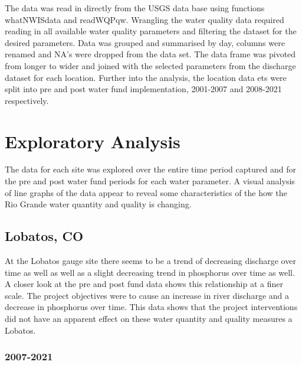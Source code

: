 \documentclass[
  12pt,
]{article}
\begin{document}
The data was read in directly from the USGS data base using functions
whatNWISdata and readWQPqw. Wrangling the water quality data required
reading in all available water quality parameters and filtering the
dataset for the desired parameters. Data was grouped and summarised by
day, columns were renamed and NA's were dropped from the data set. The
data frame was pivoted from longer to wider and joined with the selected
parameters from the discharge dataset for each location. Further into
the analysis, the location data ets were split into pre and post water
fund implementation, 2001-2007 and 2008-2021 respectively.

\newpage

\hypertarget{exploratory-analysis}{%
\section{Exploratory Analysis}\label{exploratory-analysis}}

The data for each site was explored over the entire time period captured
and for the pre and post water fund periods for each water parameter. A
visual analysis of line graphs of the data appear to reveal some
characteristics of the how the Rio Grande water quantity and quality is
changing.

\hypertarget{lobatos-co}{%
\subsection{Lobatos, CO}\label{lobatos-co}}

At the Lobatos gauge site there seems to be a trend of decreasing
discharge over time as well as well as a slight decreasing trend in
phosphorus over time as well. A closer look at the pre and post fund
data shows this relationship at a finer scale. The project objectives
were to cause an increase in river discharge and a decrease in
phosphorus over time. This data shows that the project interventions did
not have an apparent effect on these water quantity and quality measures
a Lobatos.

\hypertarget{section}{%
\subsubsection{2007-2021}\label{section}}
\end{document}
